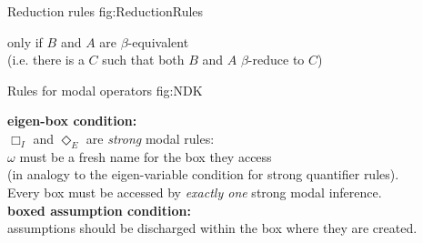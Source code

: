 \documentclass[smallextended]{svjour3}
\newcommand{\nec}{\Box} %
\newcommand{\pos}{\Diamond} %
\begin{document}
\begin{calculus}
{Reduction rules}
{fig:ReductionRules}

\vspace{1em}

\qquad\qquad\qquad\qquad\qquad\qquad\qquad\qquad\qquad
{}

\vspace{1em}

\begin{center}

only if $B$ and $A$ are $\beta$-equivalent \\ (i.e. there is a $C$ such that both $B$ and $A$ $\beta$-reduce to $C$)

\end{center}

\vspace{1em}



\end{calculus}



\begin{calculus}
{Rules for modal operators}
{fig:NDK}

\vspace{1em}

\s\s\s\s\s\s
\infer[\nec_I]{\nec A}{\omega: \fbox{\infer*{A}{}} }
\s\s\s\s
\infer[\nec_E]{w: \fbox{ \infer*{}{A} } }{\nec A}

\vspace{2em}

\s\s\s\s\s\s
\infer[\pos_I]{\pos A}{w: \fbox{\infer*{A}{}} }
\s\s\s\s
\infer[\pos_E]{\omega: \fbox{ \infer*{}{A} } }{\pos A}

\vspace{1em}


\begin{center}
\textbf{eigen-box condition:}\\ 
$\nec_I$ and $\pos_E$ are \emph{strong} modal rules: \\
$\omega$ must be a fresh name for the box they access \\ 
(in analogy to the eigen-variable condition for strong quantifier rules). \\
Every box must be accessed by \emph{exactly one} strong modal inference. \\
\vspace{0.5em}
\textbf{boxed assumption condition:} \\
assumptions should be discharged within the box where they are created.
\end{center}

\vspace{1em}

\end{calculus}
\end{document}
